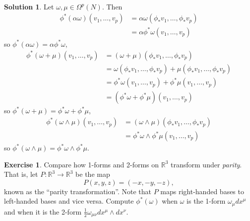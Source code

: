 \documentclass[11pt, a4paper]{report}
\theoremstyle{definition}
\newtheorem{ex}{Exercise}[part]
\newtheorem{sol}{Solution}[part]
\begin{document}
\begin{sol}
Let $\omega, \mu \in \Omega^p(N)$. Then
\begin{align*}
    \phi^* (\alpha \omega) (v_1, \ldots, v_p) &= \alpha \omega (\phi_* v_1, \ldots, \phi_* v_p) \\
        &= \alpha \phi^* \omega (v_1, \ldots, v_p)
\end{align*}
so $\phi^* (\alpha \omega) = \alpha \phi^* \omega$,
\begin{align*}
    \phi^*(\omega + \mu) (v_1, \ldots, v_p) &= (\omega + \mu) (\phi_* v_1, \ldots, \phi_* v_p) \\
        &= \omega(\phi_* v_1, \ldots, \phi_* v_p) + \mu(\phi_* v_1, \ldots, \phi_* v_p) \\
        &= \phi^* \omega (v_1, \ldots, v_p) + \phi^* \mu (v_1, \ldots, v_p) \\
        &= (\phi^* \omega + \phi^* \mu) (v_1, \ldots, v_p)
\end{align*}
so $\phi^*(\omega + \mu) = \phi^* \omega + \phi^* \mu$,
\begin{align*}
    \phi^*(\omega \wedge \mu) (v_1, \ldots, v_p) &= (\omega \wedge \mu) (\phi_* v_1, \ldots, \phi_* v_p) \\
        &= \phi^*\omega \wedge \phi^*\mu (v_1, \ldots, v_p)
\end{align*}
so $\phi^* (\omega \wedge \mu) = \phi^* \omega \wedge \phi^* \mu$.

\end{sol}

\begin{ex}

Compare how 1-forms and 2-forms on $\mathbb{R}^3$ transform under \emph{parity}. That is, let $P: \mathbb{R}^3 \to \mathbb{R}^3$ be the map
\[
    P(x, y, z) = (-x, -y, -z),
\]
known as the ``parity transformation''. Note that $P$ maps right-handed bases to left-handed bases and vice versa. Compute $\phi^*(\omega)$ when $\omega$ is the 1-form $\omega_\mu dx^\mu$ and when it is the 2-form $\frac{1}{2}\omega_{\mu\nu}dx^\mu \wedge dx^\nu$.

\end{ex}
\end{document}
